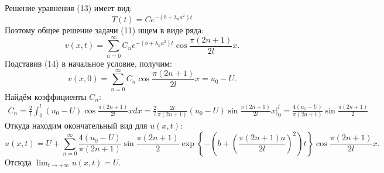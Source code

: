 \documentclass[11pt]{article}
\begin{document}
Решение уравнения (13) имеет вид:
\begin{equation*}
T(t) = Ce^{-(b + \lambda_na^2)t}
\end{equation*}
Поэтому общее решение задачи (11) ищем в виде ряда:
\begin{equation}
v(x, t) = \sum_{n = 0}^{\infty}C_ne^{-(b + \lambda_na^2)t}\cos\frac{\pi(2n + 1)}{2l}x.
\end{equation}
Подставив (14) в начальное условие, получим:
\begin{equation*}
v(x, 0) = \sum_{n = 0}^{\infty}C_n\cos\frac{\pi(2n + 1)}{2l}x = u_0 - U.
\end{equation*}
Найдём коэффициенты $C_n$:
\begin{multline*}
C_n = \frac2l\int_0^l(u_0 - U)\cos\frac{\pi(2n + 1)}{2l}xdx =
\frac2l\frac{2l}{\pi(2n + 1)}(u_0 - U)\sin\frac{\pi(2n + 1)}{2l}x\bigg|_0^l =
\frac{4(u_0 - U)}{\pi(2n + 1)}\sin\frac{\pi(2n + 1)}2
\end{multline*}
Откуда находим окончательный вид для $u(x, t)$:
\begin{equation}
u(x, t) = U + \sum_{n = 0}^{\infty}\frac{4(u_0 - U)}{\pi(2n + 1)}\sin\frac{\pi(2n + 1)}2
\exp\left\{-\left(b + \left(\frac{\pi(2n + 1)a}{2l}\right)^2\right)t\right\}\cos\frac{\pi(2n + 1)}{2l}x.
\end{equation}
Отсюда $\lim_{t \to +\infty}u(x, t) = U$.
\end{document}
